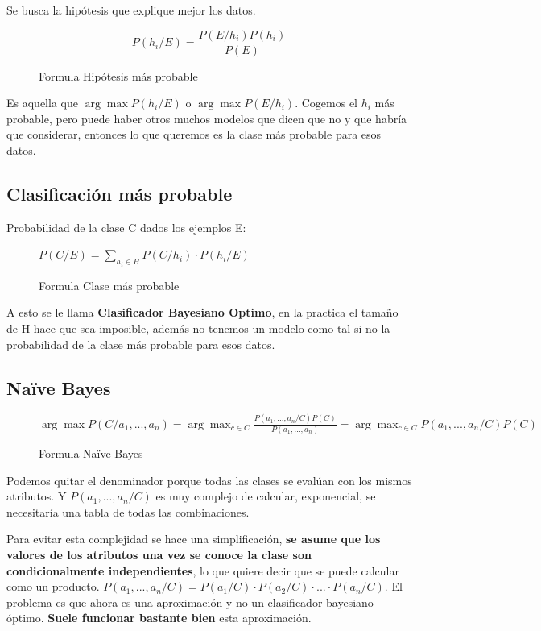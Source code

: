 \documentclass[12pt]{report} %
\begin{document}
Se busca la hipótesis que explique mejor los datos.
\begin{figure}[H]
  \[P(h_i/E)= \frac {P(E/h_i)P(h_i)}{P(E)}\]
  \captionsetup{justification=centering}
  \caption{Formula Hipótesis más probable}
\end{figure}

Es aquella que \(\arg \max P(h_i/E)\) o $\arg \max P(E/h_i) $.
Cogemos el \(h_i\) más probable, pero puede haber otros muchos modelos
que dicen que no y que habría que considerar, entonces lo que queremos
es la clase más probable para esos datos.

\subsection{Clasificación más
probable}

Probabilidad de la clase C dados los ejemplos E:
\begin{figure}[H]
  \(P(C/E) = \sum _{h_i \in H} P(C/h_i) \cdot P(h_i/E)\)
  \captionsetup{justification=centering}
  \caption{Formula Clase más probable}
\end{figure}

A esto se le llama \textbf{Clasificador Bayesiano Optimo}, en la
practica el tamaño de H hace que sea imposible, además no tenemos un
modelo como tal si no la probabilidad de la clase más probable para esos
datos.

\subsection{Naïve Bayes}

\begin{figure}[H]
  \(\arg \max P(C/a_1, ...,a_n)= \arg \max _{c \in C} \frac {P(a_1, ...,a_n/C)P(C)}{P(a_1, ...,a_n)}=\arg \max_{c \in C} P(a_1, ...,a_n/C)P(C)\)
  \captionsetup{justification=centering}
  \caption{Formula Naïve Bayes}
\end{figure}

Podemos quitar el denominador porque todas las clases se evalúan con los
mismos atributos. Y \(P(a_1, ...,a_n/C)\) es muy complejo de calcular,
exponencial, se necesitaría una tabla de todas las combinaciones.

Para evitar esta complejidad se hace una simplificación, \textbf{se
asume que los valores de los atributos una vez se conoce la clase son
condicionalmente independientes}, lo que quiere decir que se puede
calcular como un producto.
\(P(a_1, ...,a_n/C) = P(a_1/C) \cdot P(a_2/C) \cdot ... \cdot P(a_n/C)\).
El problema es que ahora es una aproximación y no un clasificador
bayesiano óptimo. \textbf{Suele funcionar bastante bien} esta
aproximación.
\end{document}
